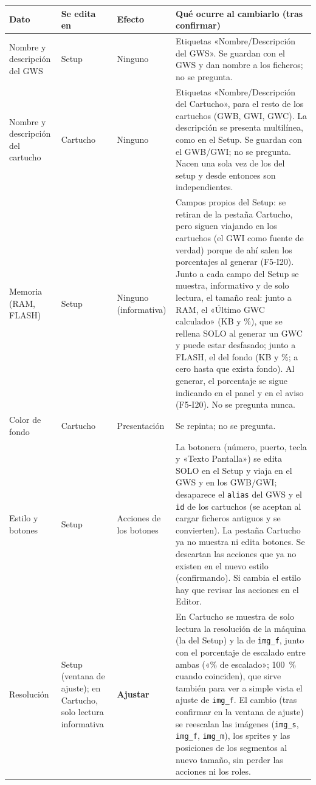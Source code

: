 \begin{table}[H]
	\centering
	\small
	\begin{tabular}{|p{3.1cm}|p{2.2cm}|p{2.6cm}|p{6.4cm}|}
		\hline
		\textbf{Dato} & \textbf{Se edita en} & \textbf{Efecto} & \textbf{Qué ocurre al cambiarlo (tras confirmar)} \\ \hline
		Nombre y descripción del GWS & Setup & Ninguno & Etiquetas «Nombre/Descripción del GWS». Se guardan con el GWS y dan nombre a los ficheros; no se pregunta. \\ \hline
		Nombre y descripción del cartucho & Cartucho & Ninguno & Etiquetas «Nombre/Descripción del Cartucho», para el resto de los cartuchos (GWB, GWI, GWC). La descripción se presenta multilínea, como en el Setup. Se guardan con el GWB/GWI; no se pregunta. Nacen una sola vez de los del setup y desde entonces son independientes. \\ \hline
		Memoria (RAM, FLASH) & Setup & Ninguno (informativa) & Campos propios del Setup: se retiran de la pestaña Cartucho, pero siguen viajando en los cartuchos (el GWI como fuente de verdad) porque de ahí salen los porcentajes al generar (F5-I20). Junto a cada campo del Setup se muestra, informativo y de solo lectura, el tamaño real: junto a RAM, el «Último GWC calculado» (KB y \%), que se rellena SOLO al generar un GWC y puede estar desfasado; junto a FLASH, el del fondo (KB y \%; a cero hasta que exista fondo). Al generar, el porcentaje se sigue indicando en el panel y en el aviso (F5-I20). No se pregunta nunca. \\ \hline
		Color de fondo & Cartucho & Presentación & Se repinta; no se pregunta. \\ \hline
		Estilo y botones & Setup & Acciones de los botones & La botonera (número, puerto, tecla y «Texto Pantalla») se edita SOLO en el Setup y viaja en el GWS y en los GWB/GWI; desaparece el \texttt{alias} del GWS y el \texttt{id} de los cartuchos (se aceptan al cargar ficheros antiguos y se convierten). La pestaña Cartucho ya no muestra ni edita botones. Se descartan las acciones que ya no existen en el nuevo estilo (confirmando). Si cambia el estilo hay que revisar las acciones en el Editor. \\ \hline
		Resolución & Setup (ventana de ajuste); en Cartucho, solo lectura informativa & \textbf{Ajustar} & En Cartucho se muestra de solo lectura la resolución de la máquina (la del Setup) y la de \texttt{img\_f}, junto con el porcentaje de escalado entre ambas («\% de escalado»; 100~\% cuando coinciden), que sirve también para ver a simple vista el ajuste de \texttt{img\_f}. El cambio (tras confirmar en la ventana de ajuste) se reescalan las imágenes (\texttt{img\_s}, \texttt{img\_f}, \texttt{img\_m}), los sprites y las posiciones de los segmentos al nuevo tamaño, sin perder las acciones ni los roles. \\ \hline

\end{tabular}
\end{table}
